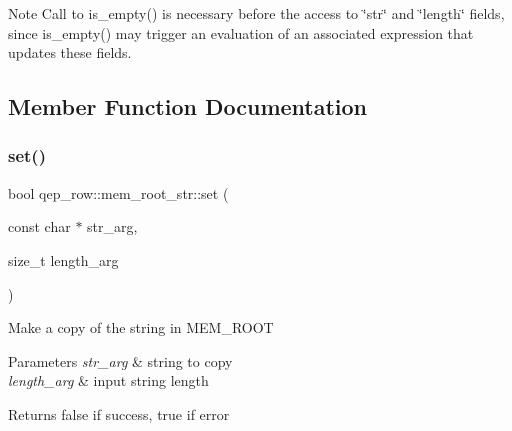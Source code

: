 \begin{DoxyNote}{Note}
Call to is\+\_\+empty() is necessary before the access to \char`\"{}str\char`\"{} and \char`\"{}length\char`\"{} fields, since is\+\_\+empty() may trigger an evaluation of an associated expression that updates these fields. 
\end{DoxyNote}


\subsection{Member Function Documentation}
\mbox{\label{structqep__row_1_1mem__root__str_a0c9b58c93472e9ff67d781a6d740e5ee}} 
\subsubsection{\texorpdfstring{set()}{set()}\hspace{0.1cm}{\footnotesize\ttfamily [1/2]}}
{\footnotesize\ttfamily bool qep\+\_\+row\+::mem\+\_\+root\+\_\+str\+::set (\begin{DoxyParamCaption}\item[{const char $\ast$}]{str\+\_\+arg,  }\item[{size\+\_\+t}]{length\+\_\+arg }\end{DoxyParamCaption})\hspace{0.3cm}{\ttfamily [inline]}}

Make a copy of the string in M\+E\+M\+\_\+\+R\+O\+OT


\begin{DoxyParams}{Parameters}
{\em str\+\_\+arg} & string to copy \\
\hline
{\em length\+\_\+arg} & input string length\\
\hline
\end{DoxyParams}
\begin{DoxyReturn}{Returns}
false if success, true if error 
\end{DoxyReturn}
\mbox{\label{structqep__row_1_1mem__root__str_a71ec1ad030a00be963f8a83e317a05b2}} 
